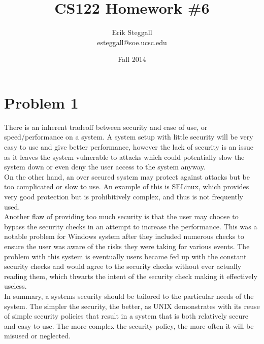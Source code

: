 \documentclass{article}
\title{CS122 Homework \#6}
\author{Erik Steggall \\ esteggall@soe.ucsc.edu}
\date{Fall 2014}
\begin{document}
 \maketitle \pagestyle{empty}
\section*{Problem 1}
There is an inherent tradeoff between security and ease of use, or speed/performance on a system. A system setup with little security will be very easy to use and give better performance, however the lack of security is an issue as it leaves the system vulnerable to attacks which could potentially slow the system down or even deny the user access to the system anyway.\\
On the other hand, an over secured system may protect against attacks but be too complicated or slow to use. An example of this is SELinux, which provides very good protection but is prohibitively complex, and thus is not frequently used.\\
Another flaw of providing too much security is that the user may choose to bypass the security checks in an attempt to increase the performance. This was a notable problem for Windows system after they included numerous checks to ensure the user was aware of the risks they were taking for various events. The problem with this system is eventually users became fed up with the constant security checks and would agree to the security checks without ever actually reading them, which thwarts the intent of the security check making it effectively useless.\\
In summary, a systems security should be tailored to the particular needs of the system. The simpler the security, the better, as UNIX demonstrates with its reuse of simple security policies that result in a system that is both relatively secure and easy to use. The more complex the security policy, the more often it will be misused or neglected.\\
\end{document}
